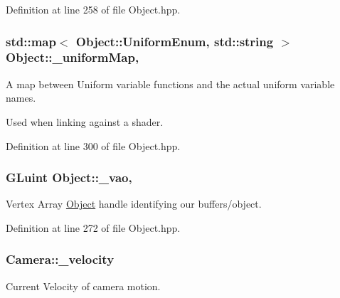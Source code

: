 Definition at line 258 of file Object.\-hpp.

\hypertarget{class_object_a6378d0b0eeec23045ae2a5245e42bf13}{
\subsubsection[{\-\_\-uniform\-Map}]{\setlength{\rightskip}{0pt plus 5cm}std\-::map$<$ {\bf Object\-::\-Uniform\-Enum}, std\-::string $>$ Object\-::\-\_\-uniform\-Map\hspace{0.3cm}{\ttfamily [protected]}, {\ttfamily [inherited]}}}\label{class_object_a6378d0b0eeec23045ae2a5245e42bf13}


A map between Uniform variable functions and the actual uniform variable names. 

Used when linking against a shader. 

Definition at line 300 of file Object.\-hpp.

\hypertarget{class_object_a564aa6b1df66a05ab6b6c2f071851c4e}{
\subsubsection[{\-\_\-vao}]{\setlength{\rightskip}{0pt plus 5cm}G\-Luint Object\-::\-\_\-vao\hspace{0.3cm}{\ttfamily [protected]}, {\ttfamily [inherited]}}}\label{class_object_a564aa6b1df66a05ab6b6c2f071851c4e}


Vertex Array \hyperlink{class_object}{Object} handle identifying our buffers/object. 



Definition at line 272 of file Object.\-hpp.

\hypertarget{class_camera_aa15577ff9e67c81699ee86d4d20a7ee7}{
\subsubsection[{\-\_\-velocity}]{ Camera\-::\-\_\-velocity\hspace{0.3cm}{\ttfamily [private]}}}\label{class_camera_aa15577ff9e67c81699ee86d4d20a7ee7}


Current Velocity of camera motion. 



